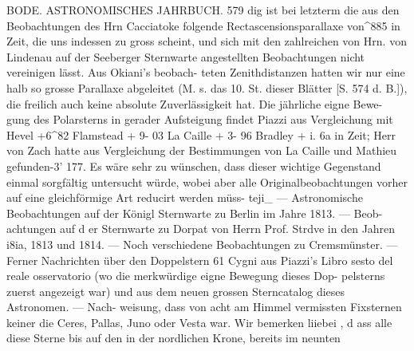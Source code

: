 \documentclass[12pt,a4paper]{article}
\begin{document}
\newpage
BODE. ASTRONOMISCHES JAHRBUCH. 579\newline
dig ist bei letzterm die aus den Beobachtungen des Hrn Cacciatoke folgende Rectascensionsparallaxe von\^{}885 in Zeit, die uns indessen zu gross scheint, und sich mit den zahlreichen von Hrn. von Lindenau\newline
auf der Seeberger Sternwarte angestellten Beobachtungen nicht vereinigen lässt. Aus Okiani's beobach-\newline
teten Zenithdistanzen hatten wir nur eine halb so grosse Parallaxe abgeleitet (M. s. das 10. St. dieser\newline
Blätter [S. 574 d. B.]), die freilich auch keine absolute Zuverlässigkeit hat. Die jährliche eigne Bewe-\newline
gung des Polarsterns in gerader Aufsteigung findet Piazzi aus Vergleichung\newline
mit Hevel +6\^{}82\newline
Flamstead + 9- 03\newline
La Caille + 3- 96\newline
Bradley + i. 6a\newline
in Zeit; Herr von Zach hatte aus Vergleichung der Bestimmungen von La Caille und Mathieu gefunden-3' 177. Es wäre sehr zu wünschen, dass dieser wichtige Gegenstand einmal sorgfältig untersucht\newline
würde, wobei aber alle Originalbeobachtungen vorher auf eine gleichförmige Art reducirt werden müss-\newline
teji\_ --- Astronomische Beobachtungen auf der Königl Sternwarte zu Berlin im Jahre 1813. --- Beob-\newline
achtungen auf d er Sternwarte zu Dorpat von Herrn Prof. Strdve in den Jahren i8ia, 1813 und 1814. ---\newline
Noch verschiedene Beobachtungen zu Cremsmünster. --- Ferner Nachrichten über den Doppelstern 61\newline
Cygni aus Piazzi's Libro sesto del reale osservatorio (wo die merkwürdige eigne Bewegung dieses Dop-\newline
pelsterns zuerst angezeigt war) und aus dem neuen grossen Sterncatalog dieses Astronomen. --- Nach-\newline
weisung, dass von acht am Himmel vermissten Fixsternen keiner die Ceres, Pallas, Juno oder Vesta war.\newline
Wir bemerken liiebei , d ass alle diese Sterne bis auf den in der nordlichen Krone, bereits im neunten\newline
\end{document}

